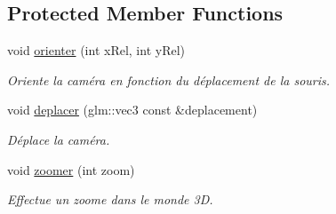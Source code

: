\subsection*{Protected Member Functions}
\begin{DoxyCompactItemize}
\item 
\hypertarget{classCameraFPS_a0b06955072fe29f6cf8a5c76828025fd}{void \hyperlink{classCameraFPS_a0b06955072fe29f6cf8a5c76828025fd}{orienter} (int x\-Rel, int y\-Rel)}\label{classCameraFPS_a0b06955072fe29f6cf8a5c76828025fd}

\begin{DoxyCompactList}\small\item\em Oriente la caméra en fonction du déplacement de la souris. \end{DoxyCompactList}\item 
\hypertarget{classCameraFPS_af71850751b121f12f25b03f75e836cc5}{void \hyperlink{classCameraFPS_af71850751b121f12f25b03f75e836cc5}{deplacer} (glm\-::vec3 const \&deplacement)}\label{classCameraFPS_af71850751b121f12f25b03f75e836cc5}

\begin{DoxyCompactList}\small\item\em Déplace la caméra. \end{DoxyCompactList}\item 
\hypertarget{classCameraFPS_a073a8db2ee3711140d0b0fc1a36086cd}{void \hyperlink{classCameraFPS_a073a8db2ee3711140d0b0fc1a36086cd}{zoomer} (int zoom)}\label{classCameraFPS_a073a8db2ee3711140d0b0fc1a36086cd}

\begin{DoxyCompactList}\small\item\em Effectue un zoome dans le monde 3\-D. \end{DoxyCompactList}\end{DoxyCompactItemize}
